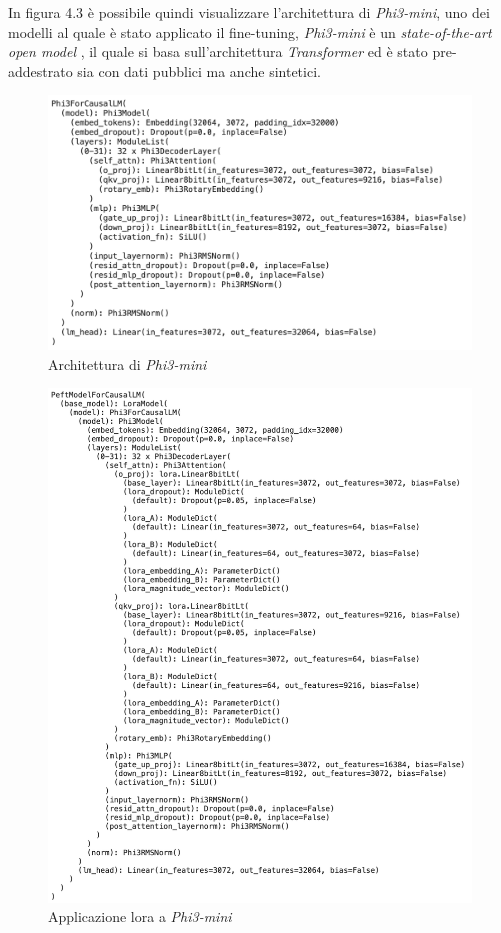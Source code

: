 In figura 4.3 è possibile quindi visualizzare l'architettura di \textit{Phi3-mini}, uno dei modelli al quale è stato applicato il \gls{fine-tuning}, \textit{Phi3-mini} è un \textit{state-of-the-art open model} , il quale si basa sull'architettura \textit{Transformer} ed è stato pre-addestrato sia con dati pubblici ma anche sintetici. 
    \begin{figure}[!h]
        \centering        
        \includegraphics[width=14.5cm]{img/Phi3.pdf}
        \caption{Architettura di \textit{Phi3-mini}}
    \end{figure}

    \begin{figure}[!h]
        \centering        
        \includegraphics[width=14.5cm]{img/LoRA.pdf}
        \caption{Applicazione \gls{lora} a \textit{Phi3-mini}}
    \end{figure}\newpage
    
